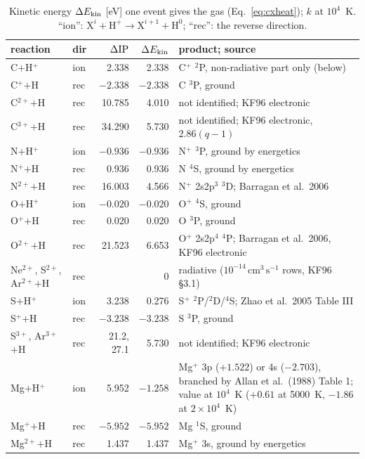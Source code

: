 \documentclass[english,a4paper]{my_memo}
\newcommand{\cmc}{\mathrm{cm^{3}\,s^{-1}}}
\begin{document}
\begin{table}[!tbp]
\centering\small
\caption{Kinetic energy $\Delta E_{\rm kin}$ [eV] one event gives the gas
(Eq.~\ref{eq:cxheat}); $k$ at $10^4$~K.  ``ion'': $\mathrm{X}^{i} +
\mathrm{H}^+ \to \mathrm{X}^{i+1} + \mathrm{H}^0$; ``rec'': the reverse
direction.}
\label{tab:cxheat}
\begin{tabular}{@{}llrrp{6.3cm}@{}}
\toprule
reaction & dir & $\Delta{\rm IP}$ & $\Delta E_{\rm kin}$ & product; source \\
\midrule
C$+$H$^+$ & ion & 2.338 & 2.338 & C$^+$ $^2$P, non-radiative part only (below) \\
C$^+$$+$H & rec & $-2.338$ & $-2.338$ & C $^3$P, ground \\
C$^{2+}$$+$H & rec & 10.785 & 4.010 & not identified; KF96 electronic \\
C$^{3+}$$+$H & rec & 34.290 & 5.730 & not identified; KF96 electronic, $2.86(q-1)$ \\
N$+$H$^+$ & ion & $-0.936$ & $-0.936$ & N$^+$ $^3$P, ground by energetics \\
N$^+$$+$H & rec & 0.936 & 0.936 & N $^4$S, ground by energetics \\
N$^{2+}$$+$H & rec & 16.003 & 4.566 & N$^+$ 2s2p$^3$ $^3$D; Barragan et al.\ 2006 \\
O$+$H$^+$ & ion & $-0.020$ & $-0.020$ & O$^+$ $^4$S, ground \\
O$^+$$+$H & rec & 0.020 & 0.020 & O $^3$P, ground \\
O$^{2+}$$+$H & rec & 21.523 & 6.653 & O$^+$ 2s2p$^4$ $^4$P; Barragan et al.\ 2006, KF96 electronic \\
Ne$^{2+}$, S$^{2+}$, Ar$^{2+}$$+$H & rec & & 0 & radiative ($10^{-14}\,\cmc$ rows, KF96 \S3.1) \\
S$+$H$^+$ & ion & 3.238 & 0.276 & S$^+$ $^2$P/$^2$D/$^4$S; Zhao et al.\ 2005 Table III \\
S$^+$$+$H & rec & $-3.238$ & $-3.238$ & S $^3$P, ground \\
S$^{3+}$, Ar$^{3+}$$+$H & rec & 21.2, 27.1 & 5.730 & not identified; KF96 electronic \\
Mg$+$H$^+$ & ion & 5.952 & $-1.258$ & Mg$^+$ 3p ($+1.522$) or 4s ($-2.703$), branched by Allan et al.\ (1988) Table 1; value at $10^4$~K ($+0.61$ at 5000~K, $-1.86$ at $2{\times}10^4$~K) \\
Mg$^+$$+$H & rec & $-5.952$ & $-5.952$ & Mg $^1$S, ground \\
Mg$^{2+}$$+$H & rec & 1.437 & 1.437 & Mg$^+$ 3s, ground by energetics \\

\end{tabular}
\end{table}
\end{document}
